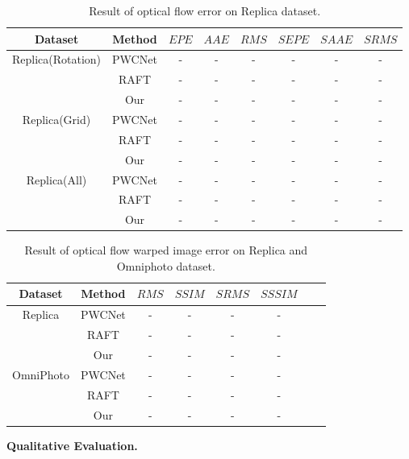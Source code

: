 \begin{table}[h!]
	\centering
	\caption{\label{fig:exp:oferrorquality}%
		Result of optical flow error on Replica dataset.}
	\begin{tabular}{c c c c c c c c}
		\hline
		 Dataset &  Method & ${EPE}$ & $AAE$ & $RMS$ & $SEPE$ & ${SAAE}$ & ${SRMS}$ \\
		\hline
		\multirow{3}{*}{Replica(Rotation)} & PWCNet & - & -  & - & - & -& - \\ 
		 & RAFT & - & -  & - & - & -& - \\ 
		 & Our & - & -  & - & - & -& - \\ 
		\hline
		\multirow{3}{*}{Replica(Grid)} & PWCNet & - & -  & - & - & -& - \\ 
		& RAFT & - & -  & - & - & -& - \\ 
		& Our & - & -  & - & - & -& - \\ 
		\hline
		\multirow{3}{*}{Replica(All)} & PWCNet & - & -  & - & - & -& - \\ 
		& RAFT & - & -  & - & - & -& - \\ 
		& Our & - & -  & - & - & -& - \\ 
		\hline
	\end{tabular}
\end{table}


\begin{table}[h!]
	\centering
	\caption{\label{fig:exp:warpingerrorquality}%
		Result of optical flow warped image error on Replica and Omniphoto dataset.}
	\begin{tabular}{c c c c c c c c}
		\hline
		Dataset &  Method & ${RMS}$ & $SSIM$ & $SRMS$ & $SSSIM$ \\
		\hline
		\multirow{3}{*}{Replica} & PWCNet & - & -  & - & - \\ 
		& RAFT & - & -  & - & - \\ 
		& Our & - & -  & - & -  \\ 
		\hline
		\multirow{3}{*}{OmniPhoto} & PWCNet & - & -  & - & - \\ 
		& RAFT & - & -  & - & - \\ 
		& Our & - & -  & - & - \\ 
		\hline
	\end{tabular}
\end{table}





\textbf{Qualitative Evaluation.}

